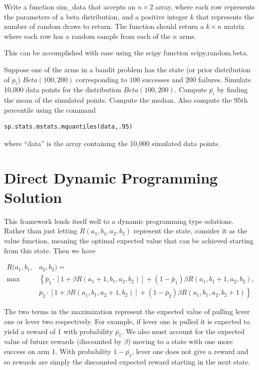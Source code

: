 \begin{problem}
Write a function sim\_data that accepts an $n\times 2$ array, where each row represents the parameters of a beta distribution, and a positive integer $k$ that represents the number of random draws to return.  The function should return a $k\times n$ matrix where each row has a random sample from each of the $n$ arms.

This can be accomplished with ease using the scipy function scipy.random.beta.
\end{problem}

\begin{problem}
Suppose one of the arms in a bandit problem has the state (or prior distribution of $p_i$) $Beta(100,200)$ corresponding to $100$ successes and $200$ failures.  Simulate 10,000 data points for the distribution $Beta(100,200)$.  Compute $\bar{p_i}$ by finding the mean of the simulated points.  Compute the median.  Also compute the $95$th percentile using the command

\begin{lstlisting}[style = python]
sp.stats.mstats.mquantiles(data,.95)
\end{lstlisting}
where ``data'' is the array containing the 10,000 simulated data points.
\end{problem}

\section*{Direct Dynamic Programming Solution}
This framework lends itself well to a dynamic programming type solutions.  Rather than just letting $R(a_1,b_1,a_2,b_2)$ represent the state, consider it as the value function, meaning the optimal expected value that can be achieved starting from this state.  Then we have

\begin{equation}\label{recurs}
\begin{aligned}
R(a_1,b_1,&a_2,b_2) =\\
 \max&\left\{\bar{p}_1\cdot[1 + \beta R(a_1+1,b_1,a_2,b_2)] + (1-\bar{p}_1)\beta R(a_1,b_1+1,a_2,b_2)\right. ,\\
&  \left.\bar{p}_2\cdot[1 + \beta R(a_1,b_1,a_2+1,b_2)] + (1-\bar{p}_2)\beta R(a_1,b_1,a_2,b_2+1)\right\}
\end{aligned}
\end{equation}

The two terms in the maximization represent the expected value of pulling lever one or lever two respectively.  For example, if lever one is pulled it is expected to yield a reward of 1 with probability $\bar{p_1}$.  We also must account for the expected value of future rewards (discounted by $\beta$) moving to a state with one more success on arm 1.  With probability $1-\bar{p_1}$, lever one does not give a reward and so rewards are simply the discounted expected reward starting in the next state.

